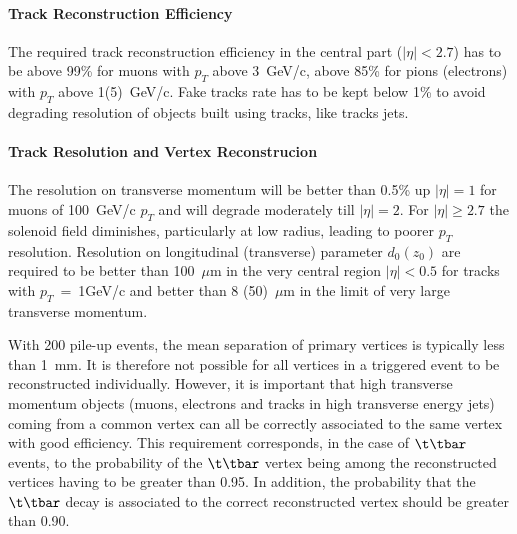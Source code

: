 \paragraph{Track Reconstruction Efficiency}
The required 
track reconstruction efficiency in the central part ($|\eta|<2.7$) has to be above 99\% for muons with 
$p_T$ above 3~GeV/c, above 85\% for pions (electrons) with 
$p_T$ above 1(5)~GeV/c.  Fake tracks rate has to be kept below 1\% to avoid degrading resolution of 
objects built using tracks, like tracks jets.

\paragraph{Track Resolution and Vertex Reconstrucion}
The resolution on transverse momentum will be better than 0.5\% up $|\eta|=1$ for muons of 100~GeV/c 
$p_T$ and will degrade moderately till $|\eta|=2$. For $|\eta|\ge2.7$ the solenoid field diminishes, 
particularly at low radius, leading to poorer $p_T$ resolution. 
Resolution on longitudinal (transverse) parameter $d_0(z_0)$ are required to be better than 100~$\mu$m 
in the very central region $|\eta|<0.5$ for tracks with $p_T$~=~1GeV/c and better than 8 (50)~$\mu$m  
in the limit of very large transverse momentum.  
 
 With 200 pile-up events, the mean separation of primary vertices is typically less than 1~mm.
 It is therefore not possible for all vertices in a triggered event to be reconstructed individually. However, it is important that high transverse momentum objects (muons, electrons and tracks in high transverse energy jets) coming from a common vertex can all be correctly associated to the same vertex with good efficiency.
  This requirement corresponds, in the case of $\t\tbar$ events, to the probability of the $\t\tbar$  vertex being among the reconstructed vertices having to be greater than 0.95. In addition, the probability that the 
$\t\tbar$  decay is associated to the correct reconstructed vertex should be greater than 0.90.
 
